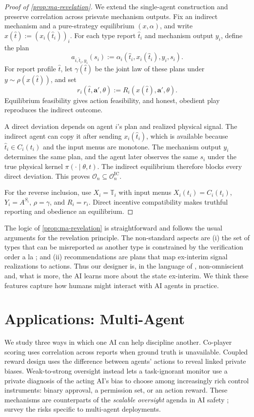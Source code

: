 \documentclass[12pt,reqno]{article}
\newcommand{\ba}{\mathbf{a}}
\theoremstyle{definition} \newtheorem{example}{Example}
\theoremstyle{definition} \newtheorem{condition}{Condition}
\theoremstyle{definition} \newtheorem{corollary}{Corollary}
\theoremstyle{definition} \newtheorem{claim}{Claim}
\theoremstyle{definition} \newtheorem{definition}{Definition}
\theoremstyle{definition} \newtheorem{conjecture}{Conjecture}
\theoremstyle{definition} \newtheorem{Lemma}{Lemma}
\theoremstyle{definition} \newtheorem{lemma}{Lemma}
\theoremstyle{plain} \newtheorem{theorem}{Theorem}
\theoremstyle{definition} \newtheorem{assumption}{Assumption}
\theoremstyle{definition} \newtheorem*{assumptionnonumber}{Assumption}
\theoremstyle{definition} \newtheorem*{theoremNoNumber}{Proposition}
\theoremstyle{definition}\newtheorem{proposition}{Proposition}
\theoremstyle{definition} \newtheorem{observation}{Observation}
\theoremstyle{definition} \newtheorem*{definitionNoNumber}{Definition}
\theoremstyle{definition} \newtheorem{Definition}{Definition}
\theoremstyle{definition} \newtheorem*{DefinitionNoNumber}{Definition}
\theoremstyle{definition} \newtheorem*{fact}{Fact}
\theoremstyle{definition} \newtheorem*{property}{Property}
\theoremstyle{definition} \newtheorem{remark}{Remark}
\theoremstyle{definition}\newtheorem{romanexampleinner}{Example}
\begin{document}
\begin{proof}[Proof of \cref{prop:ma-revelation}]
We extend the single-agent construction and preserve correlation across prisvate mechanism outputs. Fix an indirect mechanism and a pure-strategy equilibrium $(x,\alpha)$, and write $x(\hat t):=(x_i(\hat t_i))_i$. For each type report $\hat t_i$ and mechanism output $y_i$, define the plan
\[
a_{i,\hat t_i,y_i}(s_i)
:=
\alpha_i(\hat t_i,x_i(\hat t_i),y_i,s_i).
\]
For report profile $\hat t$, let $\gamma(\hat t)$ be the joint law of these plans under $y\sim\rho(x(\hat t))$, and set
\[
r_i(\hat t,\ba',\theta)
:=
R_i(x(\hat t),\ba',\theta).
\]
Equilibrium feasibility gives action feasibility, and honest, obedient play reproduces the indirect outcome.

A direct deviation depends on agent $i$'s plan and realized physical signal. The indirect agent can copy it after sending $x_i(\hat t_i)$, which is available because $\hat t_i\in C_i(t_i)$ and the input menus are monotone. The mechanism output $y_i$ determines the same plan, and the agent later observes the same $s_i$ under the true physical kernel $\pi(\cdot\mid\theta,t)$. The indirect equilibrium therefore blocks every direct deviation. This proves $\mathcal O_n\subseteq\mathcal O_n^{\mathrm{IC}}$.

For the reverse inclusion, use $X_i=\mathbb T_i$ with input menus $X_i(t_i)=C_i(t_i)$, $Y_i=A^{S_i}$, $\rho=\gamma$, and $R_i=r_i$. Direct incentive compatibility makes truthful reporting and obedience an equilibrium.
\end{proof}

The logic of \cref{prop:ma-revelation} is straightforward and follows the usual arguments for the revelation principle. The non-standard aspects are (i) the set of types that can be misreported as another type is constrained by the verification order a la \cite{green1986partially}; and (ii) recommendations are plans that map ex-interim signal realizations to actions. Thus our designer is, in the language of \cite{bergemann2019information}, non-omniscient and, what is more, the AI learns more about the state ex-interim. We think these features capture how humans might interact with AI agents in practice. 


\section{Applications: Multi-Agent}\label{sec:multi-applications}

We study three ways in which one AI can help discipline another. Co-player scoring uses correlation across reports when ground truth is unavailable. Coupled reward design uses the difference between agents' actions to reveal linked private biases. Weak-to-strong oversight instead lets a task-ignorant monitor use a private diagnosis of the acting AI's bias to choose among increasingly rich control instruments: binary approval, a permission set, or an action reward. These mechanisms are counterparts of the \emph{scalable oversight} agenda in AI safety \citep{christiano2018supervising,leike2018scalable,bowman2022measuring}; \citet{hammond2025multi} survey the risks specific to multi-agent deployments.
\end{document}
